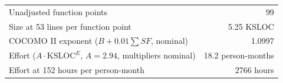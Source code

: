 \begin{center}
\begin{tabular}{@{}l r@{}}
\toprule
Unadjusted function points & 99 \\
Size at 53 lines per function point & 5.25 KSLOC \\
COCOMO II exponent ($B + 0.01 \sum SF$, nominal) & 1.0997 \\
Effort ($A \cdot \mathrm{KSLOC}^E$, $A = 2.94$, multipliers nominal) & 18.2 person-months \\
Effort at 152 hours per person-month & 2766 hours \\
\bottomrule
\end{tabular}
\end{center}
